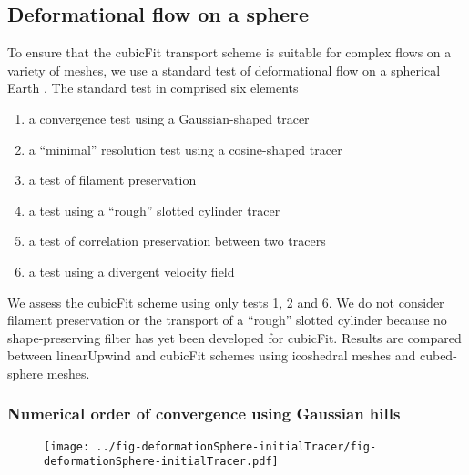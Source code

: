 \subsection{Deformational flow on a sphere}
To ensure that the cubicFit transport scheme is suitable for complex flows on a variety of meshes, we use a standard test of deformational flow on a spherical Earth \citep{lauritzen2012}.  
The standard test in \citep{lauritzen2012} comprised six elements
\begin{enumerate}
\item a convergence test using a Gaussian-shaped tracer
\item a ``minimal'' resolution test using a cosine-shaped tracer
\item a test of filament preservation
\item a test using a ``rough'' slotted cylinder tracer
\item a test of correlation preservation between two tracers
\item a test using a divergent velocity field
\end{enumerate}
We assess the cubicFit scheme using only tests 1, 2 and 6.  We do not consider filament preservation or the transport of a ``rough'' slotted cylinder because no shape-preserving filter has yet been developed for cubicFit.  
Results are compared between linearUpwind and cubicFit schemes using icoshedral meshes and cubed-sphere meshes.



\subsubsection{Numerical order of convergence using Gaussian hills}
% 

\begin{figure}
	\centering
	\texttt{[image: ../fig-deformationSphere-initialTracer/fig-deformationSphere-initialTracer.pdf]}
	\caption{}
\end{figure}

